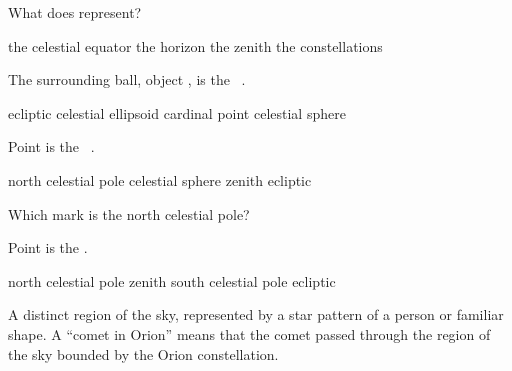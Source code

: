 \documentclass[addpoints]{exam}
\begin{document}
\begin{questions}
\begin{figure}[h!]
\end{figure}

\question \label{ques:CelestialSphere_start} 
What does  represent?

\begin{choices}
    \choice the celestial equator
    \correctchoice the horizon
    \choice the zenith
    \choice the constellations
\end{choices}

\question 
The surrounding ball, object , is the \fillin\ .

\begin{choices}
    \choice ecliptic
    \choice celestial ellipsoid
    \choice cardinal point
    \correctchoice celestial sphere
\end{choices}

\question
Point  is the \fillin\ .

\begin{choices}
    \choice north celestial pole
    \choice celestial sphere
    \correctchoice zenith
    \choice ecliptic
\end{choices}

\question 
Which mark is the north celestial pole?

\begin{oneparchoices}
    \choice {}
    \correctchoice {}
    \choice {}
    \choice {}
    \choice {}
\end{oneparchoices}

\question \label{ques:CelestialSphere_end} 
Point  is the \fillin .

\begin{choices}
    \choice north celestial pole
    \choice zenith
    \correctchoice south celestial pole
    \choice ecliptic
\end{choices}

\begin{solution}
    A distinct region of the sky, represented by a star pattern of a person or familiar shape. A ``comet in Orion'' means that the comet passed through the region of the sky bounded by the Orion constellation.
\end{solution}


\end{questions}
\end{document}
